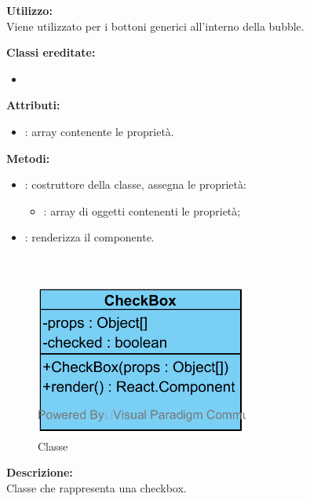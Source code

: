 \textbf{Utilizzo:}\\
Viene utilizzato per i bottoni generici all'interno della bubble.

\textbf{Classi ereditate:}
\begin{itemize}
	\item {}
\end{itemize}


\textbf{Attributi:}
\begin{itemize}
	\item {}: array contenente le proprietà.
\end{itemize}

\textbf{Metodi:}
\begin{itemize}
	\item {}: costruttore della classe, assegna le proprietà:
	\begin{itemize}
		\item {}: array di oggetti contenenti le proprietà;
	\end{itemize}
	\item {}: renderizza il componente.
\end{itemize}

\paragraph[::CheckBox]{\class}\mbox{}\\ \label{\class}
\begin{figure}[H]
	\centering
	\includegraphics[width=7cm]{./diagrammi/framework/view/gui/checkbox.png}
	\caption{Classe \class}
\end{figure}
\textbf{Descrizione:}\\
Classe che rappresenta una checkbox.

